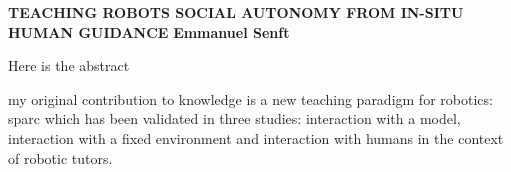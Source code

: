 \textbf{TEACHING ROBOTS SOCIAL AUTONOMY FROM IN-SITU HUMAN GUIDANCE}\newline
\textbf{Emmanuel Senft}

Here is the abstract

my original contribution to knowledge is a new teaching paradigm for robotics: \gls{sparc} which has been validated in three studies: interaction with a model, interaction with a fixed environment and interaction with humans in the context of robotic tutors.